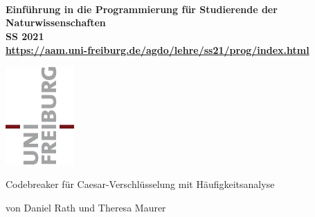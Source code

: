 \documentclass[ngerman,12pt]{article}
\renewcommand{\title}[1]{\par\vspace{5mm}\centerline{\Large #1}}
\newcommand{\subtitle}[1]{\par\vspace{1mm}\centerline{\footnotesize #1}\par}
\begin{document}

\setlength{\textwidth}{16.5cm}
\setlength{\textheight}{22cm}
\setlength{\topmargin}{0cm}
\setlength{\oddsidemargin}{-0.3cm}
\setlength{\evensidemargin}{0cm}
\vspace*{-20mm}

\parbox{20mm}{
~\\[0mm]
~\\[0mm]
~\\[-5mm]} %
\parbox{120mm}{\vspace*{1mm}\begin{center}\large\bf%
Einführung in die Programmierung für Studierende der Naturwissenschaften\\[0mm]
\hspace{5mm} SS 2021\\[0mm]
{\footnotesize\rm \url{https://aam.uni-freiburg.de/agdo/lehre/ss21/prog/index.html}}%
\end{center}}
\par\vspace{-5mm}
\vspace*{2mm}
\raisebox{1.19cm}{%
\textcolor{freiburg-gray}{\rule{0.885\textwidth}{1.1mm}}}
\par\vspace*{-37.84mm}
\hspace*{\fill}\includegraphics[width=74pt,height=107pt]{Uni_Logo.png}
\par\vspace{-5mm}

\bigskip

\title{Codebreaker für Caesar-Verschlüsselung mit Häufigkeitsanalyse}
\subtitle{von Daniel Rath und Theresa Maurer}
\renewcommand{\baselinestretch}{1.1}\normalsize

\bigskip
\end{document}
